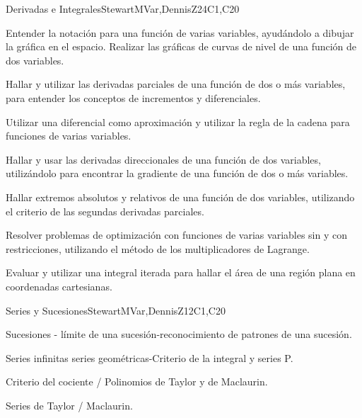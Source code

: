 \begin{syllabus}
\begin{unit}{Derivadas e Integrales}{}{StewartMVar,DennisZ}{24}{C1,C20}
  \begin{learningoutcomes}
   \item Entender la notación para una función de varias variables, ayudándolo a dibujar la gráfica en el espacio. Realizar las gráficas de curvas de nivel de una función de dos variables.
   \item Hallar y utilizar las derivadas parciales de una función de dos o más variables, para entender los conceptos de incrementos y diferenciales.
   \item Utilizar una diferencial como aproximación y utilizar la regla de la cadena para funciones de varias variables.
   \item Hallar y usar las derivadas direccionales de una función de dos variables, utilizándolo para encontrar la gradiente de una función de dos o más variables.
   \item Hallar extremos absolutos y relativos de una función de dos variables, utilizando el criterio de las segundas derivadas parciales.
   \item Resolver problemas de optimización con funciones de varias variables sin y con restricciones, utilizando el método de los multiplicadores de Lagrange.
   \item Evaluar y utilizar una integral iterada para hallar el área de una región plana en coordenadas cartesianas.
  \end{learningoutcomes}
\end{unit}


\begin{unit}{Series y Sucesiones}{}{StewartMVar,DennisZ}{12}{C1,C20}
  \begin{topics}
    \item Sucesiones - límite de una sucesión-reconocimiento de patrones de una sucesión.
    \item Series infinitas series geométricas-Criterio de la integral y series P.
    \item Criterio del cociente / Polinomios de Taylor y de Maclaurin.
    \item Series de Taylor / Maclaurin.
   \end{topics}
  

\end{unit}
\end{syllabus}
